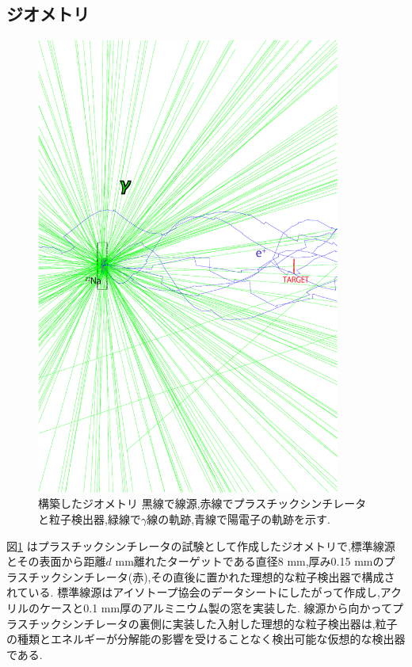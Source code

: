 \subsection{ジオメトリ}

\begin{figure}[!tbp]
	\centering
	\includegraphics[width=10cm]{img/test1_geometry.pdf}
	\caption[構築したジオメトリ]{構築したジオメトリ \newline 黒線で線源,赤線でプラスチックシンチレータと粒子検出器,緑線で$\gamma$線の軌跡,青線で陽電子の軌跡を示す.}
	\label{test1_geometry}
\end{figure}

図\ref{test1_geometry} はプラスチックシンチレータの試験として作成したジオメトリで,標準線源とその表面から距離$d$ mm離れたターゲットである直径8 mm,厚み0.15 mmのプラスチックシンチレータ(赤),その直後に置かれた理想的な粒子検出器で構成されている.
標準線源はアイソトープ協会のデータシートにしたがって作成し,アクリルのケースと0.1 mm厚のアルミニウム製の窓を実装した.
線源から向かってプラスチックシンチレータの裏側に実装した入射した理想的な粒子検出器は,粒子の種類とエネルギーが分解能の影響を受けることなく検出可能な仮想的な検出器である.

